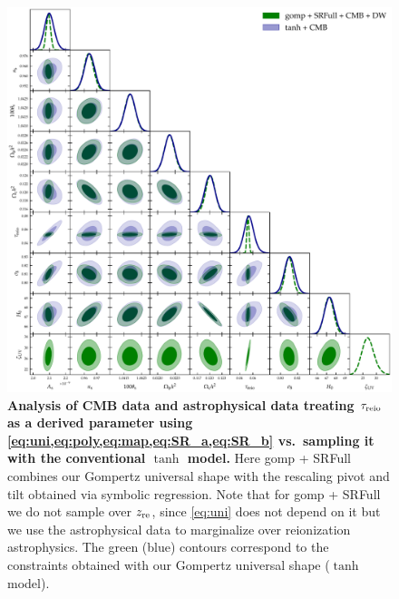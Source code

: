 \begin{figure}[t]
\centering
\includegraphics[width=\linewidth]{figs/gomp1dw_tanh_triangle_kill_full.pdf}
\caption{\textbf{Analysis of CMB data and astrophysical data treating
$\tau_{\mathrm{reio}}$ as a derived parameter using
\cref{eq:uni,eq:poly,eq:map,eq:SR_a,eq:SR_b} vs.\ sampling it with the
conventional $\tanh$ model.}
Here gomp + SRFull combines our Gompertz universal shape with the
rescaling pivot and tilt obtained via symbolic regression.
Note that for gomp + SRFull we do not sample over $z_{\mathrm{re}}$, since
\cref{eq:uni} does not depend on it but we use the astrophysical data to
 marginalize over reionization astrophysics.
The green (blue) contours correspond to the constraints obtained with
our Gompertz universal shape ($\tanh$ model).}
\label{fig:unleashed_gomp}
\end{figure}

